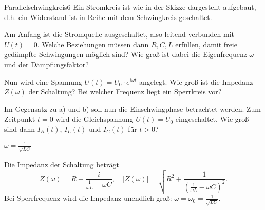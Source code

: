 \begin{problem}{Parallelschwingkreis}{6}
Ein Stromkreis ist wie in der Skizze dargestellt aufgebaut, d.h. ein Widerstand ist in Reihe mit dem Schwingkreis geschaltet.
\begin{abcenum}
\item
Am Anfang ist die Stromquelle ausgeschaltet, also leitend verbunden mit $U(t) = 0$. Welche Beziehungen müssen dann $R,C,L$ erfüllen, damit freie gedämpfte Schwingungen möglich sind? Wie groß ist dabei die Eigenfrequenz $\omega$ und der Dämpfungsfaktor?
\item Nun wird eine Spannung $U(t)=U_0\cdot e^{i\omega t}$ angelegt. Wie groß ist die Impedanz $Z(\omega)$ der Schaltung? Bei welcher Frequenz liegt ein Sperrkreis vor?
\item Im Gegensatz zu a) und b) soll nun die Einschwingphase betrachtet werden. Zum Zeitpunkt $t = 0$ wird die Gleichspannung $U(t)=U_0$ eingeschaltet. Wie groß sind dann $I_R(t)$, $I_L(t)$ und $I_C(t)$ für $t>0$?
\end{abcenum}

\begin{solution}
\begin{abcenum}
\item $\omega=\frac{1}{\sqrt{LC}}$
\item Die Impedanz der Schaltung beträgt
\[
Z(\omega)=R+\frac{i}{\frac{1}{\omega L}-\omega C}, \quad
|Z(\omega)|=\sqrt{R^2+\frac{1}{\left(\frac{1}{\omega L}-\omega C\right)^2}}.
\]
Bei Sperrfrequenz wird die Impedanz unendlich groß: $ \omega=\omega_0=\frac{1}{\sqrt{LC}} $.
\end{abcenum}
\end{solution}
\end{problem}

